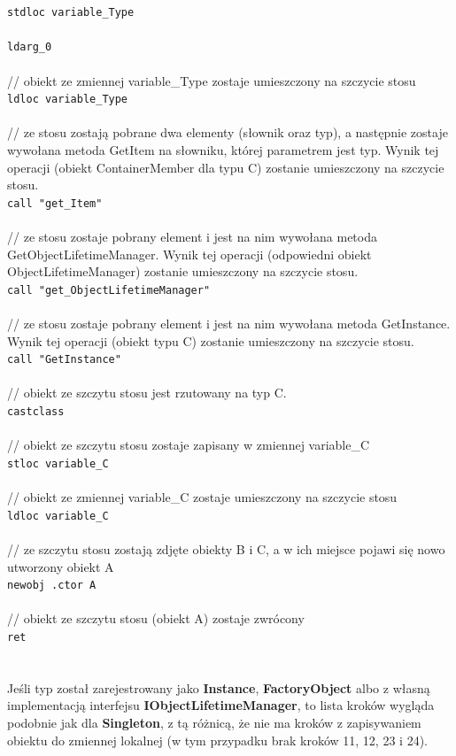 \documentclass[12pt]{article}
\begin{document}
\texttt{stdloc variable\_Type}\\
\\
\texttt{ldarg\_0}\\
\\
// obiekt ze zmiennej variable\_Type zostaje umieszczony na szczycie stosu\\
\texttt{ldloc variable\_Type}\\
\\
// ze stosu zostają pobrane dwa elementy (słownik oraz typ), a następnie zostaje wywołana metoda GetItem na słowniku, której parametrem jest typ. Wynik tej operacji (obiekt ContainerMember dla typu C) zostanie umieszczony na szczycie stosu.\\
\texttt{call "get\_Item"}\\
\\
// ze stosu zostaje pobrany element i jest na nim wywołana metoda GetObjectLifetimeManager. Wynik tej operacji (odpowiedni obiekt ObjectLifetimeManager) zostanie umieszczony na szczycie stosu.\\
\texttt{call "get\_ObjectLifetimeManager"}\\
\\
// ze stosu zostaje pobrany element i jest na nim wywołana metoda GetInstance. Wynik tej operacji (obiekt typu C) zostanie umieszczony na szczycie stosu.\\
\texttt{call "GetInstance"}\\
\\
// obiekt ze szczytu stosu jest rzutowany na typ C.\\
\texttt{castclass}\\
\\
// obiekt ze szczytu stosu zostaje zapisany w zmiennej variable\_C\\
\texttt{stloc variable\_C}\\
\\
// obiekt ze zmiennej variable\_C zostaje umieszczony na szczycie stosu\\
\texttt{ldloc variable\_C}\\
\\
// ze szczytu stosu zostają zdjęte obiekty B i C, a w ich miejsce pojawi się nowo utworzony obiekt A\\
\texttt{newobj .ctor A}\\
\\
// obiekt ze szczytu stosu (obiekt A) zostaje zwrócony\\
\texttt{ret}\\
\\
\\
Jeśli typ został zarejestrowany jako \textbf{Instance}, \textbf{FactoryObject} albo z własną implementacją interfejsu \textbf{IObjectLifetimeManager}, to lista kroków wygląda podobnie jak dla \textbf{Singleton}, z tą różnicą, że nie ma kroków z zapisywaniem obiektu do zmiennej lokalnej (w tym przypadku brak kroków 11, 12, 23 i 24).
\end{document}
